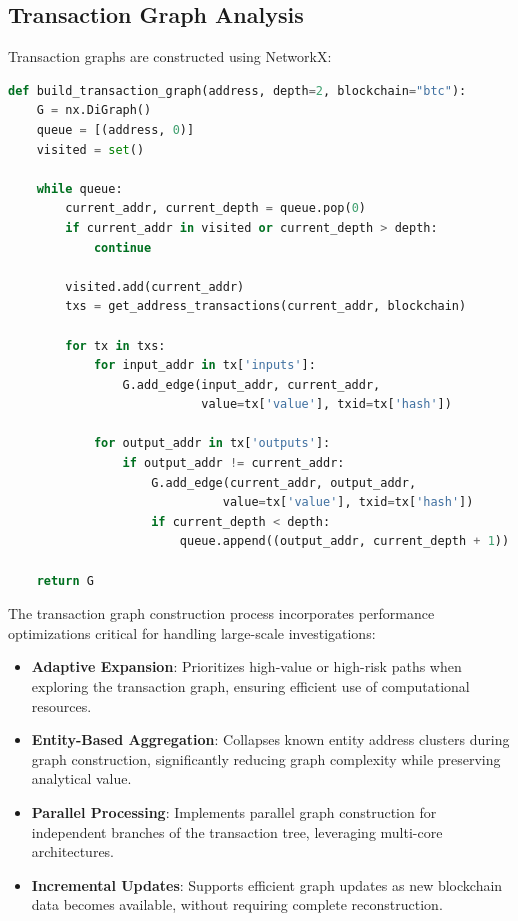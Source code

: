 \documentclass[conference]{IEEEtran}
\begin{document}
\subsection{Transaction Graph Analysis}

Transaction graphs are constructed using NetworkX:
\begin{lstlisting}[language=Python]
def build_transaction_graph(address, depth=2, blockchain="btc"):
    G = nx.DiGraph()
    queue = [(address, 0)]
    visited = set()
    
    while queue:
        current_addr, current_depth = queue.pop(0)
        if current_addr in visited or current_depth > depth:
            continue
        
        visited.add(current_addr)
        txs = get_address_transactions(current_addr, blockchain)
        
        for tx in txs:
            for input_addr in tx['inputs']:
                G.add_edge(input_addr, current_addr, 
                           value=tx['value'], txid=tx['hash'])
            
            for output_addr in tx['outputs']:
                if output_addr != current_addr:
                    G.add_edge(current_addr, output_addr, 
                              value=tx['value'], txid=tx['hash'])
                    if current_depth < depth:
                        queue.append((output_addr, current_depth + 1))
    
    return G
\end{lstlisting}

The transaction graph construction process incorporates performance optimizations critical for handling large-scale investigations:

\begin{itemize}
    \item \textbf{Adaptive Expansion}: Prioritizes high-value or high-risk paths when exploring the transaction graph, ensuring efficient use of computational resources.
    
    \item \textbf{Entity-Based Aggregation}: Collapses known entity address clusters during graph construction, significantly reducing graph complexity while preserving analytical value.
    
    \item \textbf{Parallel Processing}: Implements parallel graph construction for independent branches of the transaction tree, leveraging multi-core architectures.
    
    \item \textbf{Incremental Updates}: Supports efficient graph updates as new blockchain data becomes available, without requiring complete reconstruction.
\end{itemize}
\end{document}
